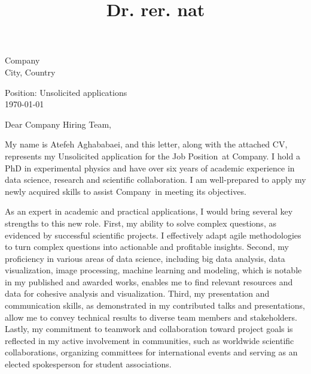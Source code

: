 \documentclass[11pt,a4paper,sans]{moderncv} %
\title{Dr. rer. nat}
\newcommand{\compname}{Company} %
\newcommand{\compaddress}{City, Country} %
\newcommand{\positionname}{Unsolicited applications} %
\newcommand{\positionn}{Job Position} %
\newcommand{\DepartmentTeam}{Company Hiring Team} %
\begin{document}
\begin{raggedright}
\makecvtitle %
\end{raggedright}
%
%
\begin{minipage}[t]{0.65\textwidth} 
\compname\\
\compaddress
\end{minipage}
\begin{minipage}[t]{0.34\textwidth} 
Position: \positionname\\
\today
\vspace{1.5cm}
\end{minipage}


Dear \DepartmentTeam,

\vspace{0.5cm}

My name is Atefeh Aghababaei, and this letter, along with the attached CV, represents my Unsolicited application for the \positionn\ at \compname . 
I hold a PhD in experimental physics and have over six years of academic experience in data science, research and scientific collaboration. I am well-prepared to apply my newly acquired skills to assist \compname\ in meeting its objectives. 

As an expert in academic and practical applications, I would bring several key strengths to this new role. First, my ability to solve complex questions, as evidenced by successful scientific projects. I effectively adapt agile methodologies to turn complex questions into actionable and profitable insights.
Second, my proficiency in various areas of data science, including big data analysis, data visualization, image processing, machine learning and modeling, which is notable in my published and awarded works, enables me to find relevant resources and data for cohesive analysis and visualization. 
Third, my presentation and communication skills, as demonstrated in my contributed talks and presentations, allow me to convey technical results to diverse team members and stakeholders. 
Lastly, my commitment to teamwork and collaboration toward project goals is reflected in my active involvement in communities, such as worldwide scientific collaborations, organizing committees for international events and serving as an elected spokesperson for student associations.
\end{document}
